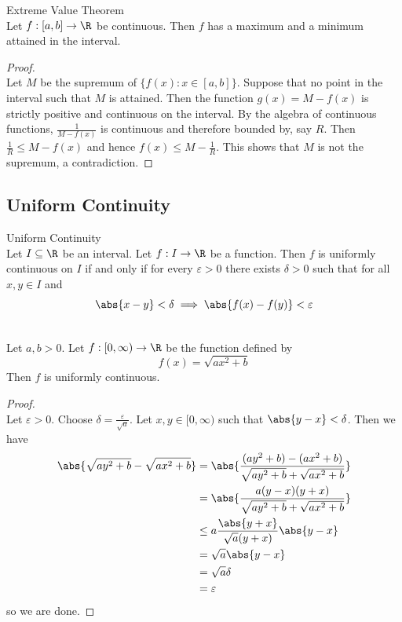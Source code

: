 \documentclass[a4paper]{article}
\begin{document}
\begin{thm}{Extreme Value Theorem}{}\\ Let $f:[a,b]\to\R$ be continuous. Then $f$ has a maximum and a minimum attained in the interval. 
\begin{proof}\\ Let $M$ be the supremum of $\{f(x):x\in[a,b]\}$. Suppose that no point in the interval such that $M$ is attained. Then the function $g(x)=M-f(x)$ is strictly positive and continuous on the interval. By the algebra of continuous functions, $\frac{1}{M-f(x)}$ is continuous and therefore bounded by, say $R$. Then $\frac{1}{R}\leq M-f(x)$ and hence $f(x)\leq M-\frac{1}{R}$. This shows that $M$ is not the supremum, a contradiction. 
\end{proof}
\end{thm}

\subsection{Uniform Continuity}
\begin{defn}{Uniform Continuity}{}\\
Let $I\subseteq\R$ be an interval. Let $f:I\to\R$ be a function. Then $f$ is uniformly continuous on $I$ if and only if for every $\varepsilon>0$ there exists $\delta>0$ such that for all $x,y\in I$ and $$\abs{x-y}<\delta\implies\abs{f(x)-f(y)}<\varepsilon$$ 
\end{defn}

\begin{eg}{}{}\\
Let $a,b>0$. Let $f:[0,\infty)\to\R$ be the function defined by $$f(x)=\sqrt{ax^2+b}$$ Then $f$ is uniformly continuous. 
\begin{proof}\\
Let $\varepsilon>0$. Choose $\delta=\frac{\varepsilon}{\sqrt{a}}$. Let $x,y\in[0,\infty)$ such that $\abs{y-x}<\delta$. Then we have 
\begin{align*}
\abs{\sqrt{ay^2+b}-\sqrt{ax^2+b}}&=\abs{\frac{(ay^2+b)-(ax^2+b)}{\sqrt{ay^2+b}+\sqrt{ax^2+b}}}\\
&=\abs{\frac{a(y-x)(y+x)}{\sqrt{ay^2+b}+\sqrt{ax^2+b}}}\\
&\leq a\frac{\abs{y+x}}{\sqrt{a}(y+x)}\abs{y-x}\\
&=\sqrt{a}\abs{y-x}\\
&=\sqrt{a}\delta\\
&=\varepsilon
\end{align*}
so we are done. 
\end{proof}
\end{eg}
\end{document}
